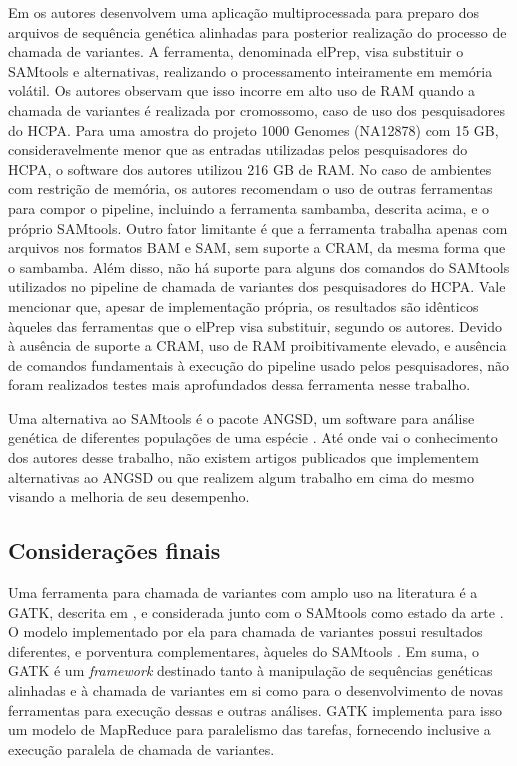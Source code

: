 \documentclass[cic,tc]{iiufrgs}
\begin{document}
Em \cite{herzeel2015elprep} os autores desenvolvem uma aplicação
multiprocessada para preparo dos arquivos de sequência genética alinhadas para
posterior realização do processo de chamada de variantes. A ferramenta,
denominada elPrep, visa substituir o SAMtools e alternativas, realizando o
processamento inteiramente em memória volátil. Os autores observam que isso
incorre em alto uso de RAM quando a chamada de variantes é realizada por
cromossomo, caso de uso dos pesquisadores do HCPA. Para uma amostra do projeto
1000 Genomes (NA12878) com 15 GB, consideravelmente menor que as entradas
utilizadas pelos pesquisadores do HCPA, o software dos autores utilizou 216 GB
de RAM. No caso de ambientes com restrição de memória, os autores recomendam o
uso de outras ferramentas para compor o pipeline, incluindo a ferramenta
sambamba, descrita acima, e o próprio SAMtools. Outro fator limitante é que a
ferramenta trabalha apenas com arquivos nos formatos BAM e SAM, sem suporte a
CRAM, da mesma forma que o sambamba. Além disso, não há suporte para alguns dos
comandos do SAMtools utilizados no pipeline de chamada de variantes dos
pesquisadores do HCPA. Vale mencionar que, apesar de implementação própria, os
resultados são idênticos àqueles das ferramentas que o elPrep visa substituir,
segundo os autores. Devido à ausência de suporte a CRAM, uso de RAM
proibitivamente elevado, e ausência de comandos fundamentais à execução do
pipeline usado pelos pesquisadores, não foram realizados testes mais
aprofundados dessa ferramenta nesse trabalho.

Uma alternativa ao SAMtools é o pacote ANGSD, um software para análise genética
de diferentes populações de uma espécie \cite{korneliussen2014angsd}. Até onde
vai o conhecimento dos autores desse trabalho, não existem artigos publicados
que implementem alternativas ao ANGSD ou que realizem algum trabalho em cima do
mesmo visando a melhoria de seu desempenho.

\subsection{Considerações finais}
\label{sec:alt}

Uma ferramenta para chamada de variantes com amplo uso na literatura
\cite{de2017gatk} é a GATK, descrita em \cite{mckenna2010genome}, e considerada
junto com o SAMtools como estado da
arte \cite{yao2020evaluation} \cite{poplin2018universal}. O modelo implementado
por ela para chamada de variantes possui resultados diferentes, e porventura
complementares, àqueles do
SAMtools \cite{gezsi2015variantmetacaller} \cite{hwang2015systematic}. Em suma, o
GATK é um \textit{framework} destinado tanto à manipulação de sequências genéticas
alinhadas e à chamada de variantes em si como para o desenvolvimento de novas
ferramentas para execução dessas e outras análises. GATK implementa para isso
um modelo de MapReduce para paralelismo das tarefas, fornecendo inclusive a
execução paralela de chamada de variantes.
\end{document}
